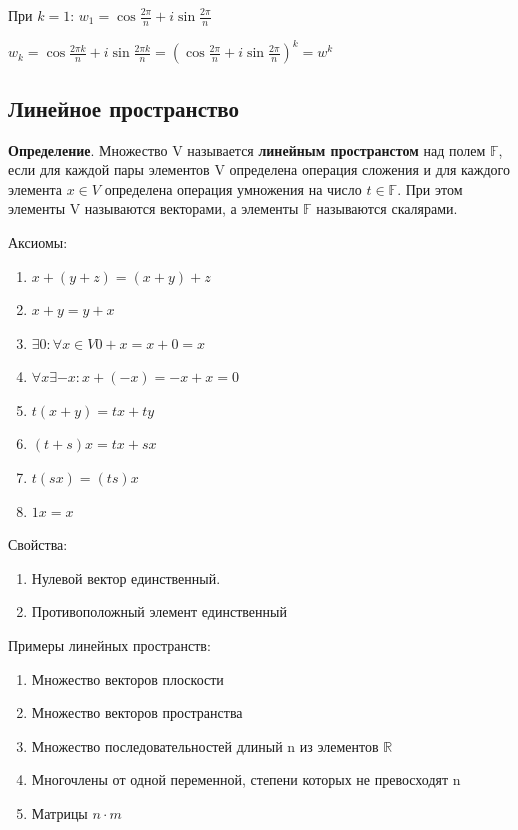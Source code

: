 \documentclass[a4paper]{article}
\begin{document}
При $k=1$: $\displaystyle w_1 = \cos \frac{2\pi}{n} + i \sin \frac{2\pi}{n}$

$\displaystyle w_k = \cos \frac{2\pi k}{n} + i \sin \frac{2 \pi k}{n} = \left( \cos \frac{2\pi}{n} + i \sin \frac{2 \pi}{n} \right)^k = w^k$


\newpage \begin{center}\begin{Large}\end{Large}\end{center}
\subsection*{Линейное пространство}
\textbf{Определение}. Множество V называется \textbf{линейным пространстом} над полем $\mathbb{F}$, если для каждой пары элементов V определена операция сложения и для каждого элемента $x \in V$ определена операция умножения на число $t \in \mathbb{F}$. При этом элементы V называются векторами, а элементы $\mathbb{F}$ называются скалярами.

Аксиомы:
\begin{enumerate}
\item $x+(y+z) = (x+y)+z$
\item $x+y=y+x$
\item $\exists 0: \forall x \in V 0 + x = x + 0 = x$
\item $\forall x \exists -x: x + (-x) = -x + x = 0$
\item $t(x+y) = tx + ty$
\item $(t+s)x = tx + sx$
\item $t(sx) = (ts)x$
\item $1x = x$
\end{enumerate}


Свойства:
\begin{enumerate}
\item Нулевой вектор единственный.
\item Противоположный элемент единственный
\end{enumerate}

Примеры линейных пространств:
\begin{enumerate}
\item Множество векторов плоскости
\item Множество векторов пространства
\item Множество последовательностей длиный n из элементов $\mathbb{R}$
\item Многочлены от одной переменной, степени которых не превосходят n
\item Матрицы $n \cdot m$
\end{enumerate}
\end{document}
